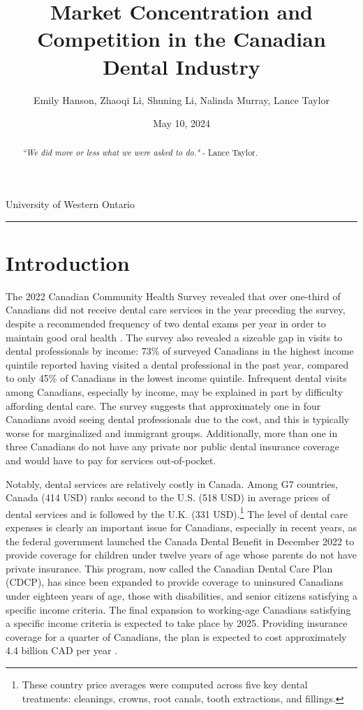 \documentclass[a4paper,11pt]{article}
\title{\vspace{-1.2cm} Market Concentration and Competition in the Canadian Dental Industry}
\author{Emily Hanson, Zhaoqi Li, Shuning Li, Nalinda Murray, Lance Taylor }
\date{May 10, 2024}
\begin{document}
\maketitle \vspace{-.4 in}
\begin{center}
University of Western Ontario
\rule{\textwidth}{1pt} 
\end{center}




\begin{abstract}
\textit{``We did more or less what we were asked to do."} - Lance Taylor.
\end{abstract}

\section{Introduction}
The 2022 Canadian Community Health Survey revealed that over one-third of Canadians did not receive dental care services in the year preceding the survey, despite a recommended frequency of two dental exams per year in order to maintain good oral health \citep{StatisticsCanada}. The survey also revealed a sizeable gap in visits to dental professionals by income: 73\% of surveyed Canadians in the highest income quintile reported having visited a dental professional in the past year, compared to only 45\% of Canadians in the lowest income quintile. Infrequent dental visits among Canadians, especially by income, may be explained in part by difficulty affording dental care. The survey suggests that approximately one in four Canadians avoid seeing dental professionals due to the cost, and this is typically worse for marginalized and immigrant groups. Additionally, more than one in three Canadians do not have any private nor public dental insurance coverage and would have to pay for services out-of-pocket.

Notably, dental services are relatively costly in Canada. Among G7 countries, Canada (414 USD) ranks second to the U.S. (518 USD) in average prices of dental services \citep{Sankovich} and is followed by the U.K. (331 USD).\footnote{These country price averages were computed across five key dental treatments: cleanings, crowns, root canals, tooth extractions, and fillings.} The level of dental care expenses is clearly an important issue for Canadians, especially in recent years, as the federal government launched the Canada Dental Benefit in December 2022 to provide coverage for children under twelve years of age whose parents do not have private insurance. This program, now called the Canadian Dental Care Plan (CDCP), has since been expanded to provide coverage to uninsured Canadians under eighteen years of age, those with disabilities, and senior citizens satisfying a specific income criteria. The final expansion to working-age Canadians satisfying a specific income criteria is expected to take place by 2025. Providing insurance coverage for a quarter of Canadians, the plan is expected to cost approximately 4.4 billion CAD per year \citep{Rachini}.
\end{document}
